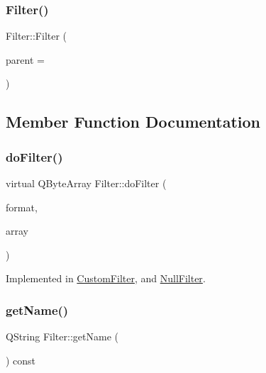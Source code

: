 \subsubsection{\texorpdfstring{Filter()}{Filter()}}
{\footnotesize\ttfamily Filter\+::\+Filter (\begin{DoxyParamCaption}\item[{Q\+Object $\ast$}]{parent = {} }\end{DoxyParamCaption})\hspace{0.3cm}{\ttfamily [explicit]}}



\subsection{Member Function Documentation}
\hypertarget{class_filter_aa401218a142d916f84aafece09eac301}{}\label{class_filter_aa401218a142d916f84aafece09eac301} 
\subsubsection{\texorpdfstring{do\+Filter()}{doFilter()}}
{\footnotesize\ttfamily virtual Q\+Byte\+Array Filter\+::do\+Filter (\begin{DoxyParamCaption}\item[{Q\+Audio\+Format}]{format,  }\item[{Q\+Byte\+Array}]{array }\end{DoxyParamCaption})\hspace{0.3cm}{\ttfamily [pure virtual]}}



Implemented in \hyperlink{class_custom_filter_aafa4ccbab26275b5ef223158cbb684ab}{Custom\+Filter}, and \hyperlink{class_null_filter_a738c372168e34415189cb289ead46479}{Null\+Filter}.

\hypertarget{class_filter_a61e8bcd49b821b5e994216d87564b672}{}\label{class_filter_a61e8bcd49b821b5e994216d87564b672} 
\subsubsection{\texorpdfstring{get\+Name()}{getName()}}
{\footnotesize\ttfamily Q\+String Filter\+::get\+Name (\begin{DoxyParamCaption}{ }\end{DoxyParamCaption}) const}

